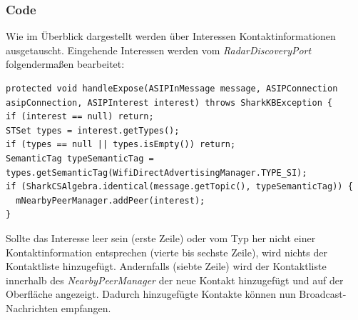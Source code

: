 \subsubsection{Code}
Wie im Überblick dargestellt werden über Interessen Kontaktinformationen ausgetauscht. Eingehende Interessen werden vom \textit{RadarDiscoveryPort} folgendermaßen bearbeitet:\newline
 \lstset{language=Java, caption=Verwertung von  Kontakt-Interessen (Auszug), label=DescriptiveLabel, numbers=left, numbersep=1em, breaklines=true, basicstyle=\small}
\begin{lstlisting}
protected void handleExpose(ASIPInMessage message, ASIPConnection asipConnection, ASIPInterest interest) throws SharkKBException {
if (interest == null) return;
STSet types = interest.getTypes();
if (types == null || types.isEmpty()) return;
SemanticTag typeSemanticTag = types.getSemanticTag(WifiDirectAdvertisingManager.TYPE_SI);
if (SharkCSAlgebra.identical(message.getTopic(), typeSemanticTag)) {
  mNearbyPeerManager.addPeer(interest);
}
\end{lstlisting}
Sollte das Interesse leer sein (erste Zeile) oder vom Typ her nicht einer Kontaktinformation entsprechen (vierte bis sechste Zeile), wird nichts der Kontaktliste hinzugefügt. Andernfalls (siebte Zeile) wird der Kontaktliste innerhalb des \textit{NearbyPeerManager} der neue Kontakt hinzugefügt und auf der Oberfläche angezeigt. Dadurch hinzugefügte Kontakte können nun Broadcast-Nachrichten empfangen.

